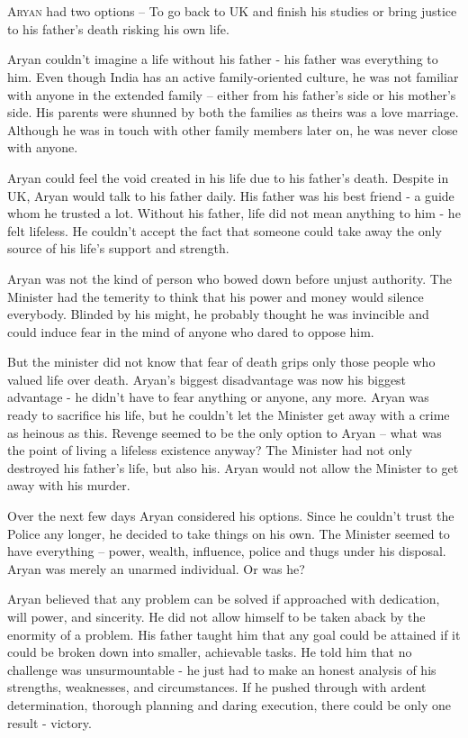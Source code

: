 \chapter{}

\lettrine{A}{ryan} had two options – To go back to UK and finish his studies or bring justice
to his father's death risking his own life.

Aryan couldn't imagine a life without his father - his father was everything to
him. Even though India has an active family-oriented culture, he was not
familiar with anyone in the extended family – either from his father's side or
his mother's side. His parents were shunned by both the families as theirs was
a love marriage. Although he was in touch with other family members later on, he
was never close with anyone.

Aryan could feel the void created in his life due to his father's death. Despite
in UK, Aryan would talk to his father daily. His father was his best friend - a
guide whom he trusted a lot. Without his father, life did not mean anything to
him - he felt lifeless. He couldn't accept the fact that someone could take away
the only source of his life's support and strength.

Aryan was not the kind of person who bowed down before unjust authority. The
Minister had the temerity to think that his power and money would silence
everybody. Blinded by his might, he probably thought he was invincible and could
induce fear in the mind of anyone who dared to oppose him.

But the minister did not know that fear of death grips only those people who
valued life over death. Aryan's biggest disadvantage was now his biggest
advantage - he didn't have to fear anything or anyone, any more. Aryan was ready
to sacrifice his life, but he couldn't let the Minister get away with a crime as
heinous as this. Revenge seemed to be the only option to Aryan – what was the
point of living a lifeless existence anyway? The Minister had not only destroyed
his father's life, but also his. Aryan would not allow the Minister to get away
with his murder.

Over the next few days Aryan considered his options. Since he couldn't trust the
Police any longer, he decided to take things on his own. The Minister seemed to
have everything – power, wealth, influence, police and thugs under his disposal.
Aryan was merely an unarmed individual. Or was he?

Aryan believed that any problem can be solved if approached with dedication,
will power, and sincerity. He did not allow himself to be taken aback by the
enormity of a problem. His father taught him that any goal could be attained if
it could be broken down into smaller, achievable tasks. He told him that no
challenge was unsurmountable - he just had to make an honest analysis of his
strengths, weaknesses, and circumstances. If he pushed through with ardent
determination, thorough planning and daring execution, there could be only one
result - victory.

